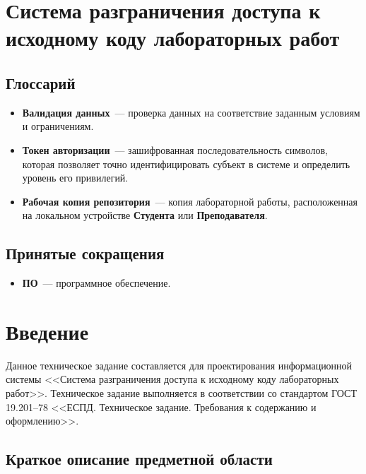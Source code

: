 \documentclass{bmstu}
\begin{document}
  \chapter*{Система разграничения доступа к исходному коду
  лабораторных работ}

  \section*{Глоссарий}

  \begin{itemize}
    \item[] \textbf{Валидация данных}~--- проверка данных на
      соответствие заданным условиям и ограничениям.
    \item[] \textbf{Токен авторизации}~--- зашифрованная
      последовательность символов, которая позволяет точно
      идентифицировать субъект в системе и определить уровень его
      привилегий.
    \item[] \textbf{Рабочая копия репозитория}~--- копия лабораторной работы, расположенная на 
    локальном устройстве \textbf{Студента} или \textbf{Преподавателя}. 
  \end{itemize}

  \section*{Принятые сокращения}

  \begin{itemize}
    \item[] \textbf{ПО}~--- программное обеспечение.
  \end{itemize}

  \chapter{Введение}

  Данное техническое задание составляется для проектирования информационной системы
  <<Система разграничения доступа к исходному коду лабораторных
  работ>>.
  Техническое задание выполняется в соответствии со стандартом ГОСТ
  19.201–78 <<ЕСПД. Техническое задание. Требования к содержанию и
  оформлению>>.

  \section{Краткое описание предметной области}
\end{document}
